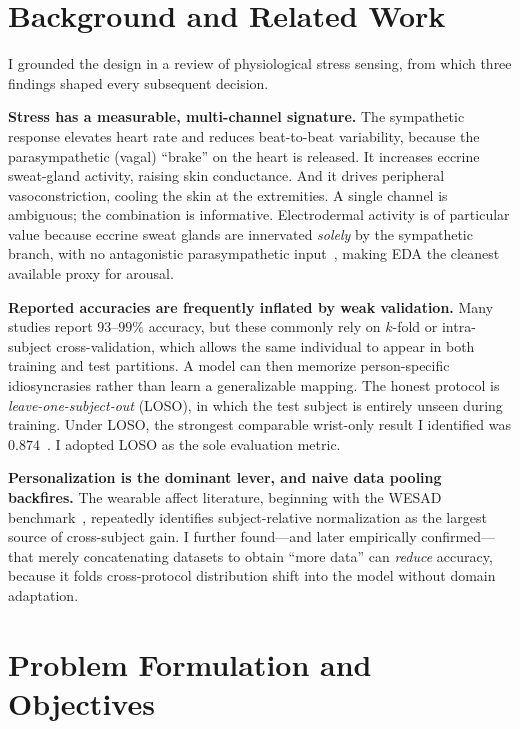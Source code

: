 \documentclass[11pt,a4paper]{article}
\begin{document}
\section{Background and Related Work}

I grounded the design in a review of physiological stress sensing, from which three findings shaped
every subsequent decision.

\textbf{Stress has a measurable, multi-channel signature.} The sympathetic response elevates heart
rate and reduces beat-to-beat variability, because the parasympathetic (vagal) ``brake'' on the
heart is released. It increases eccrine sweat-gland activity, raising skin conductance. And it
drives peripheral vasoconstriction, cooling the skin at the extremities. A single channel is
ambiguous; the combination is informative. Electrodermal activity is of particular value because
eccrine sweat glands are innervated \emph{solely} by the sympathetic branch, with no antagonistic
parasympathetic input~\cite{greco2016cvxeda}, making EDA the cleanest available proxy for arousal.

\textbf{Reported accuracies are frequently inflated by weak validation.} Many studies report
$93$--$99\%$ accuracy, but these commonly rely on $k$-fold or intra-subject cross-validation, which
allows the same individual to appear in both training and test partitions. A model can then memorize
person-specific idiosyncrasies rather than learn a generalizable mapping. The honest protocol is
\emph{leave-one-subject-out} (LOSO), in which the test subject is entirely unseen during training.
Under LOSO, the strongest comparable wrist-only result I identified was $0.874$~\cite{siirtola2019}.
I adopted LOSO as the sole evaluation metric.

\textbf{Personalization is the dominant lever, and naive data pooling backfires.} The wearable
affect literature, beginning with the WESAD benchmark~\cite{schmidt2018wesad}, repeatedly identifies
subject-relative normalization as the largest source of cross-subject gain. I further found---and
later empirically confirmed---that merely concatenating datasets to obtain ``more data'' can
\emph{reduce} accuracy, because it folds cross-protocol distribution shift into the model without
domain adaptation.

\section{Problem Formulation and Objectives}
\end{document}

